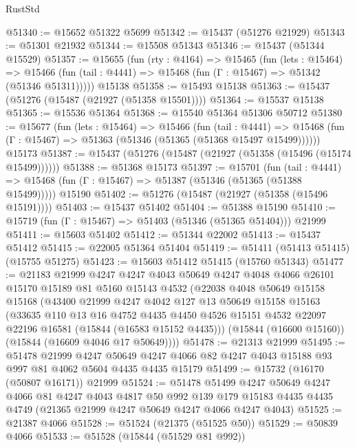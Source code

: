 \begin{lexlean}{RustStd}
\begin{coremodule}
@51340 := @15652 @51322 @5699
@51342 := @15437 (@51276 @21929)
@51343 := @51301 @21932
@51344 := @15508 @51343
@51346 := @15437 (@51344 @15529)
@51357 := @15655
    (fun (rty : @4164) =>
    @15465
      (fun (lets : @15464) =>
      @15466 (fun (tail : @4441) => @15468 (fun (Γ : @15467) => @51342 (@51346 @51311)))))
    @15138
@51358 := @15493 @15138
@51363 := @15437 (@51276 (@15487 (@21927 (@51358 @15501))))
@51364 := @15537 @15138
@51365 := @15536 @51364
@51368 := @15540 @51364 @51306 @50712
@51380 := @15677
    (fun (lets : @15464) =>
    @15466
      (fun (tail : @4441) =>
      @15468 (fun (Γ : @15467) => @51363 (@51346 (@51365 (@51368 @15497 @15499))))))
    @15173
@51387 := @15437 (@51276 (@15487 (@21927 (@51358 (@15496 (@15174 @15499))))))
@51388 := @51368 @15173
@51397 := @15701
    (fun (tail : @4441) => @15468 (fun (Γ : @15467) => @51387 (@51346 (@51365 (@51388 @15499)))))
    @15190
@51402 := @51276 (@15487 (@21927 (@51358 (@15496 @15191))))
@51403 := @15437 @51402
@51404 := @51388 @15190
@51410 := @15719 (fun (Γ : @15467) => @51403 (@51346 (@51365 @51404))) @21999
@51411 := @15603 @51402
@51412 := @51344 @22002
@51413 := @15437 @51412
@51415 := @22005 @51364 @51404
@51419 := @51411 (@51413 @51415) (@15755 @51275)
@51423 := @15603 @51412 @51415 (@15760 @51343)
@51477 := @21183
    @21999
    @4247
    @4247
    @4043
    @50649
    @4247
    @4048
    @4066
    @26101
    @15170
    @15189
    @81
    @5160
    @15143
    @4532
    (@22038
      @4048
      @50649
      @15158
      @15168
      (@43400
        @21999
        @4247
        @4042
        @127
        @13
        @50649
        @15158
        @15163
        (@33635
          @110
          @13
          @16
          @4752
          @4435
          @4450
          @4526
          @15151
          @4532
          @22097
          @22196
          @16581
          (@15844 (@16583 @15152 @4435)))
        (@15844 (@16600 @15160))
        (@15844 (@16609 @4046 @17 @50649))))
@51478 := @21313 @21999
@51495 := @51478
    @21999
    @4247
    @50649
    @4247
    @4066
    @82
    @4247
    @4043
    @15188
    @93
    @997
    @81
    @4062
    @5604
    @4435
    @4435
    @15179
@51499 := @15732 (@16170 (@50807 @16171)) @21999
@51524 := @51478
    @51499
    @4247
    @50649
    @4247
    @4066
    @81
    @4247
    @4043
    @4817
    @50
    @992
    @139
    @179
    @15183
    @4435
    @4435
    @4749
    (@21365 @21999 @4247 @50649 @4247 @4066 @4247 @4043)
@51525 := @21387 @4066
@51528 := @51524 (@21375 (@51525 @50))
@51529 := @50839 @4066
@51533 := @51528 (@15844 (@51529 @81 @992))

\end{coremodule}
\end{lexlean}
